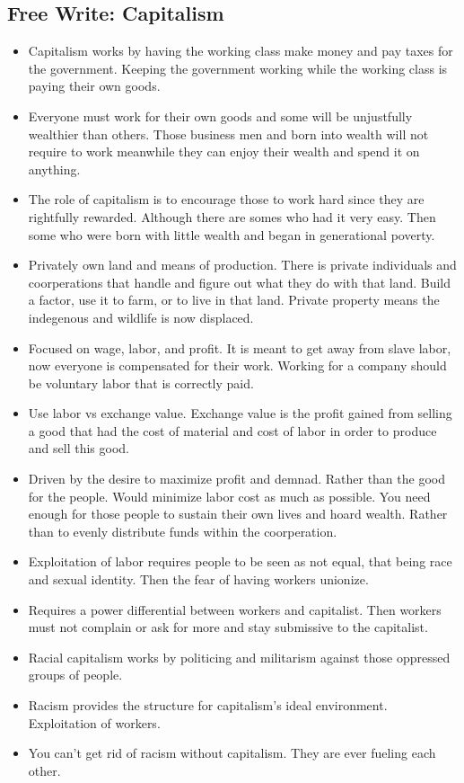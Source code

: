 \documentclass{article}
\begin{document}
\subsection{Free Write: Capitalism}
\begin{itemize}
  \item Capitalism works by having the working class make money and pay
    taxes for the government. Keeping the government working while 
    the working class is paying their own goods.
  \item Everyone must work for their own goods
    and some will be unjustfully wealthier than others.
    Those business men and born into wealth will not require to work
    meanwhile they can enjoy their wealth and spend it on anything.
  \item The role of capitalism is to encourage those to work
    hard since they are rightfully rewarded. Although there
    are somes who had it very easy. Then some
    who were born with little wealth and began
    in generational poverty.
  \item Privately own land and means of production.
    There is private individuals and coorperations that handle and 
    figure out what they do with that land.
    Build a factor, use it to farm, or to live in that land.
    Private property means the indegenous and wildlife 
    is now displaced.
  \item Focused on wage, labor, and profit. It is meant to get away from slave labor,
    now everyone is compensated for their work.
    Working for a company should be voluntary labor that is correctly paid.
  \item Use labor vs exchange value.
    Exchange value is the profit gained from selling a good that
    had the cost of material and cost of labor in order to produce and sell this good.
  \item Driven by the desire to maximize profit and demnad. Rather 
    than the good for the people. 
    Would minimize labor cost as much as possible. You need enough for those
    people to sustain their own lives and hoard wealth. Rather than to
    evenly distribute funds within the coorperation.
  \item Exploitation of labor requires people to be seen as not equal, that
    being race and sexual identity. Then the fear of having workers unionize.
  \item Requires a power differential between workers and capitalist.
    Then workers must not complain or ask for more and stay submissive
    to the capitalist.
  \item Racial capitalism works by politicing and militarism against
    those oppressed groups of people.
  \item Racism provides the structure for capitalism's ideal environment.
    Exploitation of workers.
  \item You can't get rid of racism without capitalism. They are ever fueling
    each other.
\end{itemize}
\end{document}
